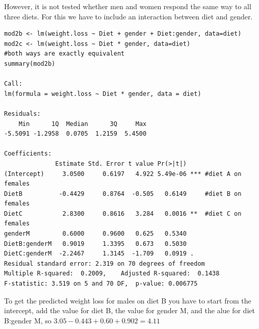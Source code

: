 \documentclass{article}
\begin{document}
However, it is not tested whether men and women respond the same way to all three diets. For this we have to include an interaction between diet and gender. 
\begin{lstlisting}
mod2b <- lm(weight.loss ~ Diet + gender + Diet:gender, data=diet)
mod2c <- lm(weight.loss ~ Diet * gender, data=diet)
#both ways are exactly equivalent
summary(mod2b)

Call:
lm(formula = weight.loss ~ Diet * gender, data = diet)

Residuals:
    Min      1Q  Median      3Q     Max 
-5.5091 -1.2958  0.0705  1.2159  5.4500 

Coefficients:
              Estimate Std. Error t value Pr(>|t|)    
(Intercept)     3.0500     0.6197   4.922 5.49e-06 *** #diet A on females
DietB          -0.4429     0.8764  -0.505   0.6149     #diet B on females
DietC           2.8300     0.8616   3.284   0.0016 **  #diet C on females
genderM         0.6000     0.9600   0.625   0.5340     
DietB:genderM   0.9019     1.3395   0.673   0.5030    
DietC:genderM  -2.2467     1.3145  -1.709   0.0919 .  
Residual standard error: 2.319 on 70 degrees of freedom
Multiple R-squared:  0.2009,	Adjusted R-squared:  0.1438 
F-statistic: 3.519 on 5 and 70 DF,  p-value: 0.006775
\end{lstlisting}
To get the predicted weight loss for males on diet B you have to start from the intercept, add the value for diet B, the value for gender M, and the alue for diet B:gender M, so $3.05 -0.443 +0.60 +0.902 = 4.11$
\end{document}
